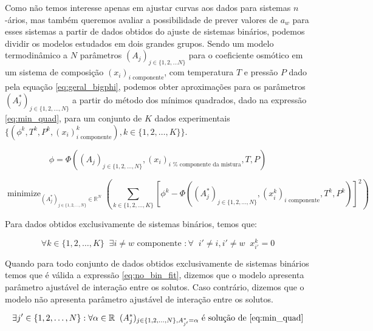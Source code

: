 \documentclass[
	12pt,				%
	openright,
	twoside,
	a4paper,			%
	english,			%
	french,				%
	brazil				%
	]{abntex2}
\DeclareMathOperator*{\minimize}{minimize}
\begin{document}
Como não temos interesse apenas em ajustar curvas aos dados para sistemas
$n$-ários, mas também queremos avaliar a possibilidade de prever valores de
$a_w$ para esses sistemas a partir de dados obtidos do ajuste de sistemas
binários, podemos dividir os modelos estudados em dois grandes grupos. Sendo um
modelo termodinâmico a $N$ parâmetros $(A_j)_{j \in \{1, 2, \ldots N\}}$ para o
coeficiente osmótico em um sistema de composição $(x_i)_\text{$i$ componente}$,
com temperatura $T$ e pressão $P$ dado pela equação \ref{eq:geral_bigphi},
podemos obter aproximações para os parâmetros $(A_j^*)_{j \in \{1, 2, \ldots, N\}}$
a partir do método dos mínimos quadrados, dado na expressão \ref{eq:min_quad},
para um conjunto de $K$ dados experimentais $\{(\phi^k, T^k, P^k,%
	(x_i)^k_\text{$i$ componente}), k \in \{1,2,\ldots,K\}\}$.

\begin{equation}
	\label{eq:geral_bigphi}
	\phi = \Phi((A_j)_{j \in \{1, 2, \ldots, N\}}, (x_i)_\text{$i$ %
		componente da mistura}, T, P)
\end{equation}

\begin{equation}
	\label{eq:min_quad}
	\minimize_{(A_j^*)_{j \in \{1,2,\ldots,N\}} \in \mathbb{R}^N}%
	\left(\sum_{k \in \{1,2,\ldots,K\}}\left[\phi^k - \Phi((A^*_j)_{j%
	\in \{1, 2, \ldots, N\}}, (x^k_i)_\text{$i$ componente},%
	T^k, P^k)\right]^2\right)
\end{equation}

Para dados obtidos exclusivamente de sistemas binários, temos que:

\begin{equation}
	\forall k \in \{1,2,\ldots,K\} \;\; \exists i \neq w%
	\text{ componente } : \forall \;\; i' \neq i, i' \neq w\;\; x^k_{i'} = 0
\end{equation}

Quando para todo conjunto de dados obtidos exclusivamente de sistemas binários
temos que é válida a expressão \ref{eq:no_bin_fit},
dizemos que o modelo apresenta parâmetro ajustável de interação entre os
solutos. Caso contrário, dizemos que o modelo não apresenta parâmetro
ajustável de interação entre os solutos.

\begin{equation}
	\label{eq:no_bin_fit}
	\exists j' \in \{1,2,\ldots,N\} : \forall \alpha \in \mathbb{R}\;\;%
	(A_j^*)_{j \in \{1,2,\ldots,N\}, A_{j'}^* = \alpha}%
	\text{ é solução de \ref{eq:min_quad}}
\end{equation}
\end{document}

